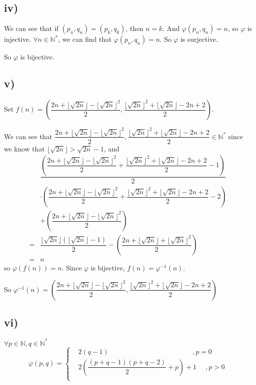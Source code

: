 \documentclass[a4paper,12pt,titlepage]{article}
\begin{document}
\subsection*{iv)}
We can see that if $(p_n,q_n)=(p_k,q_k)$, then $n=k$. And $\varphi(p_n,q_n)=n$, so $\varphi$ is injective. $\forall n\in\mathbb{N}^*$, we can find that $\varphi(p_n,q_n)=n$. So $\varphi$ is surjective. 

So $\varphi$ is bijective.

\subsection*{v)}
Set $f(n)=(\dfrac{2n+\lfloor\sqrt{2n}\rfloor-\lfloor\sqrt{2n}\rfloor^2}{2},\dfrac{\lfloor\sqrt{2n}\rfloor^2+\lfloor\sqrt{2n}\rfloor-2n+2}{2})$. 

We can see that 
$ \dfrac{2n+\lfloor\sqrt{2n}\rfloor-\lfloor\sqrt{2n}\rfloor^2}{2},\dfrac{\lfloor\sqrt{2n}\rfloor^2+\lfloor\sqrt{2n}\rfloor-2n+2}{2}\in\mathbb{N}^*$ since we know that $\lfloor\sqrt{2n}\rfloor>\sqrt{2n}-1$, and
\begin{align*}
&\dfrac{(\dfrac{2n+\lfloor\sqrt{2n}\rfloor-\lfloor\sqrt{2n}\rfloor^2}{2}+\dfrac{\lfloor\sqrt{2n}\rfloor^2+\lfloor\sqrt{2n}\rfloor-2n+2}{2}-1)}{2}\\
&\cdot(\dfrac{2n+\lfloor\sqrt{2n}\rfloor-\lfloor\sqrt{2n}\rfloor^2}{2}+\dfrac{\lfloor\sqrt{2n}\rfloor^2+\lfloor\sqrt{2n}\rfloor-2n+2}{2}-2)\\
&+(\dfrac{2n+\lfloor\sqrt{2n}\rfloor-\lfloor\sqrt{2n}\rfloor^2}{2})\\
=&\dfrac{\lfloor\sqrt{2n}\rfloor(\lfloor\sqrt{2n}\rfloor-1)}{2}-(\dfrac{2n+\lfloor\sqrt{2n}\rfloor+\lfloor\sqrt{2n}\rfloor^2}{2})\\
=&n
\end{align*}
so $\varphi(f(n))=n$. Since $\varphi$ is bijective, $f(n)=\varphi^{-1}(n)$. 

So $\varphi^{-1}(n)=(\dfrac{2n+\lfloor\sqrt{2n}\rfloor-\lfloor\sqrt{2n}\rfloor^2}{2},\dfrac{\lfloor\sqrt{2n}\rfloor^2+\lfloor\sqrt{2n}\rfloor-2n+2}{2})$

\subsection*{vi)}
$\forall p\in\mathbb{N},q\in\mathbb{N}^*$
$$\varphi(p,q)=\left\{
\begin{aligned}
&2(q-1)\,\quad\quad\quad\quad\quad\quad\quad\quad\quad\quad\quad\quad,p=0\\
&2(\dfrac{(p+q-1)(p+q-2)}{2}+p)+1\quad\,\,, p>0\\
\end{aligned}
\right.
$$
\end{document}
